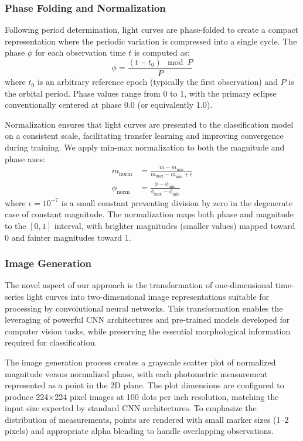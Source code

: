 \documentclass[11pt,a4paper]{article}
\begin{document}
\subsubsection{Phase Folding and Normalization}

Following period determination, light curves are phase-folded to create a compact representation where the periodic variation is compressed into a single cycle. The phase $\phi$ for each observation time $t$ is computed as:
\begin{equation}
    \phi = \frac{(t - t_0) \mod P}{P}
\end{equation}
where $t_0$ is an arbitrary reference epoch (typically the first observation) and $P$ is the orbital period. Phase values range from 0 to 1, with the primary eclipse conventionally centered at phase 0.0 (or equivalently 1.0).

Normalization ensures that light curves are presented to the classification model on a consistent scale, facilitating transfer learning and improving convergence during training. We apply min-max normalization to both the magnitude and phase axes:
\begin{align}
    m_{\text{norm}} &= \frac{m - m_{\text{min}}}{m_{\text{max}} - m_{\text{min}} + \epsilon} \\
    \phi_{\text{norm}} &= \frac{\phi - \phi_{\text{min}}}{\phi_{\text{max}} - \phi_{\text{min}}}
\end{align}
where $\epsilon = 10^{-7}$ is a small constant preventing division by zero in the degenerate case of constant magnitude. The normalization maps both phase and magnitude to the $[0, 1]$ interval, with brighter magnitudes (smaller values) mapped toward 0 and fainter magnitudes toward 1.

\subsubsection{Image Generation}

The novel aspect of our approach is the transformation of one-dimensional time-series light curves into two-dimensional image representations suitable for processing by convolutional neural networks. This transformation enables the leveraging of powerful CNN architectures and pre-trained models developed for computer vision tasks, while preserving the essential morphological information required for classification.

The image generation process creates a grayscale scatter plot of normalized magnitude versus normalized phase, with each photometric measurement represented as a point in the 2D plane. The plot dimensions are configured to produce 224$\times$224 pixel images at 100 dots per inch resolution, matching the input size expected by standard CNN architectures. To emphasize the distribution of measurements, points are rendered with small marker sizes (1--2 pixels) and appropriate alpha blending to handle overlapping observations.
\end{document}
